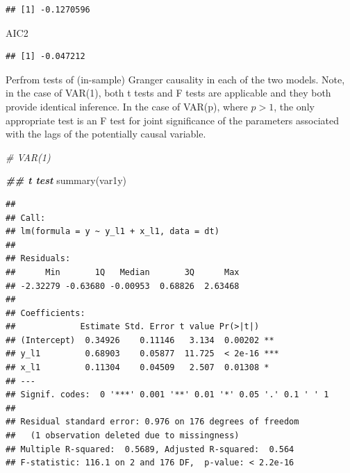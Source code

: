 \documentclass[
  12pt,
  oneside]{book}
\newenvironment{Shaded}{\begin{snugshade}}{\end{snugshade}}
\newcommand{\CommentTok}[1]{\textcolor[rgb]{0.56,0.35,0.01}{\textit{#1}}}
\newcommand{\DecValTok}[1]{\textcolor[rgb]{0.00,0.00,0.81}{#1}}
\newcommand{\DocumentationTok}[1]{\textcolor[rgb]{0.56,0.35,0.01}{\textbf{\textit{#1}}}}
\newcommand{\FunctionTok}[1]{\textcolor[rgb]{0.00,0.00,0.00}{#1}}
\newcommand{\NormalTok}[1]{#1}
\newcommand{\OtherTok}[1]{\textcolor[rgb]{0.56,0.35,0.01}{#1}}
\newcommand{\SpecialCharTok}[1]{\textcolor[rgb]{0.00,0.00,0.00}{#1}}
\begin{document}
\begin{Shaded}
\end{Shaded}

\begin{verbatim}
## [1] -0.1270596
\end{verbatim}

\begin{Shaded}
\begin{Highlighting}[]
\NormalTok{AIC2}
\end{Highlighting}
\end{Shaded}

\begin{verbatim}
## [1] -0.047212
\end{verbatim}

Perfrom tests of (in-sample) Granger causality in each of the two models. Note, in the case of VAR(1), both t tests and F tests are applicable and they both provide identical inference. In the case of VAR(p), where \(p>1\), the only appropriate test is an F test for joint significance of the parameters associated with the lags of the potentially causal variable.

\begin{Shaded}
\begin{Highlighting}[]
\CommentTok{\# VAR(1)}

\DocumentationTok{\#\# t test}
\FunctionTok{summary}\NormalTok{(var1y)}
\end{Highlighting}
\end{Shaded}

\begin{verbatim}
## 
## Call:
## lm(formula = y ~ y_l1 + x_l1, data = dt)
## 
## Residuals:
##      Min       1Q   Median       3Q      Max 
## -2.32279 -0.63680 -0.00953  0.68826  2.63468 
## 
## Coefficients:
##             Estimate Std. Error t value Pr(>|t|)    
## (Intercept)  0.34926    0.11146   3.134  0.00202 ** 
## y_l1         0.68903    0.05877  11.725  < 2e-16 ***
## x_l1         0.11304    0.04509   2.507  0.01308 *  
## ---
## Signif. codes:  0 '***' 0.001 '**' 0.01 '*' 0.05 '.' 0.1 ' ' 1
## 
## Residual standard error: 0.976 on 176 degrees of freedom
##   (1 observation deleted due to missingness)
## Multiple R-squared:  0.5689, Adjusted R-squared:  0.564 
## F-statistic: 116.1 on 2 and 176 DF,  p-value: < 2.2e-16
\end{verbatim}
\end{document}
